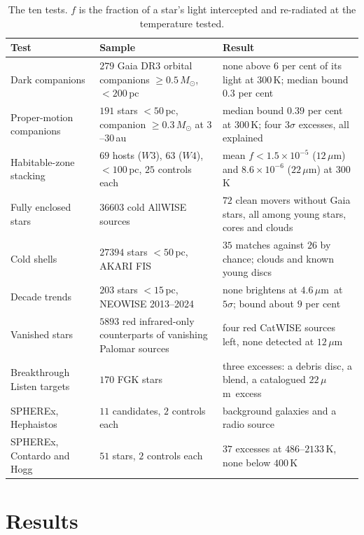 \documentclass[3p,11pt]{elsarticle}
\newcommand{\um}{\,$\mu$m}
\newcommand{\sci}[2]{#1\times10^{#2}}
\begin{document}
\begin{table}[t]
\centering\small
\caption{The ten tests. $f$ is the fraction of a star's light intercepted and re-radiated
at the temperature tested.}
\label{tab:tests}
\begin{tabular}{>{\raggedright\arraybackslash}p{} >{\raggedright\arraybackslash}p{} >{\raggedright\arraybackslash}p{}}
\toprule
Test & Sample & Result \\
\midrule
Dark companions & $279$ Gaia DR3 orbital companions $\geq0.5\,M_\odot$, $<200$\,pc & none above $6$ per cent of its light at $300$\,K; median bound $0.3$ per cent \\
Proper-motion companions & $191$ stars $<50$\,pc, companion $\geq0.3\,M_\odot$ at $3$--$30$\,au & median bound $0.39$ per cent at $300$\,K; four $3\sigma$ excesses, all explained \\
Habitable-zone stacking & $69$ hosts ($W3$), $63$ ($W4$), $<100$\,pc, $25$ controls each & mean $f<\sci{1.5}{-5}$ ($12$\um) and $\sci{8.6}{-6}$ ($22$\um) at $300$\,K \\
Fully enclosed stars & $36603$ cold AllWISE sources & $72$ clean movers without Gaia stars, all among young stars, cores and clouds \\
Cold shells & $27394$ stars $<50$\,pc, AKARI FIS & $35$ matches against $26$ by chance; clouds and known young discs \\
Decade trends & $203$ stars $<15$\,pc, NEOWISE 2013--2024 & none brightens at $4.6$\um\ at $5\sigma$; bound about $9$ per cent \\
Vanished stars & $5893$ red infrared-only counterparts of vanishing Palomar sources & four red CatWISE sources left, none detected at $12$\um \\
Breakthrough Listen targets & $170$ FGK stars & three excesses: a debris disc, a blend, a catalogued $22$\um\ excess \\
SPHEREx, Hephaistos & $11$ candidates, $2$ controls each & background galaxies and a radio source \\
SPHEREx, Contardo and Hogg & $51$ stars, $2$ controls each & $37$ excesses at $486$--$2133$\,K, none below $400$\,K \\
\bottomrule
\end{tabular}
\end{table}

\section{Results}\label{sec:results}
\end{document}
